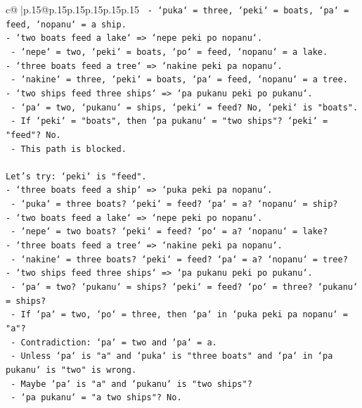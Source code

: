 \documentclass{article}
\begin{document}
{\begin{supertabular}{c@{$\;$}|p{.15\linewidth}@{}p{.15\linewidth}p{.15\linewidth}p{.15\linewidth}p{.15\linewidth}p{.15\linewidth}}
{{{\texttt{  {-} `puka` = three, `peki` = boats, `pa` = feed, `nopanu` = a ship.} \\
\texttt{{-} `two boats feed a lake` => `nepe peki po nopanu`.} \\
\texttt{  {-} `nepe` = two, `peki` = boats, `po` = feed, `nopanu` = a lake.} \\
\texttt{{-} `three boats feed a tree` => `nakine peki pa nopanu`.} \\
\texttt{  {-} `nakine` = three, `peki` = boats, `pa` = feed, `nopanu` = a tree.} \\
\texttt{{-} `two ships feed three ships` => `pa pukanu peki po pukanu`.} \\
\texttt{  {-} `pa` = two, `pukanu` = ships, `peki` = feed? No, `peki` is "boats".} \\
\texttt{  {-} If `peki` = "boats", then `pa pukanu` = "two ships"? `peki` = "feed"? No.} \\
\texttt{  {-} This path is blocked.} \\
\\ 
\texttt{Let's try: `peki` is "feed".} \\
\texttt{{-} `three boats feed a ship` => `puka peki pa nopanu`.} \\
\texttt{  {-} `puka` = three boats? `peki` = feed? `pa` = a? `nopanu` = ship?} \\
\texttt{{-} `two boats feed a lake` => `nepe peki po nopanu`.} \\
\texttt{  {-} `nepe` = two boats? `peki` = feed? `po` = a? `nopanu` = lake?} \\
\texttt{{-} `three boats feed a tree` => `nakine peki pa nopanu`.} \\
\texttt{  {-} `nakine` = three boats? `peki` = feed? `pa` = a? `nopanu` = tree?} \\
\texttt{{-} `two ships feed three ships` => `pa pukanu peki po pukanu`.} \\
\texttt{  {-} `pa` = two? `pukanu` = ships? `peki` = feed? `po` = three? `pukanu` = ships?} \\
\texttt{  {-} If `pa` = two, `po` = three, then `pa` in `puka peki pa nopanu` = "a"?} \\
\texttt{  {-} Contradiction: `pa` = two and `pa` = a.} \\
\texttt{  {-} Unless `pa` is "a" and `puka` is "three boats" and `pa` in `pa pukanu` is "two" is wrong.} \\
\texttt{  {-} Maybe `pa` is "a" and `pukanu` is "two ships"?} \\
\texttt{  {-} `pa pukanu` = "a two ships"? No.} \\
}}}
\end{supertabular}}
\end{document}
